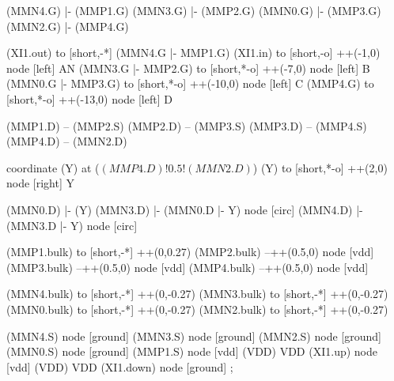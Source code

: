 \begin{circuitikz}[american]
	
	(MMN4.G) |- (MMP1.G)
	(MMN3.G) |- (MMP2.G)
	(MMN0.G) |- (MMP3.G)
	(MMN2.G) |- (MMP4.G)
	
	(XI1.out) to [short,-*] (MMN4.G |- MMP1.G)
	(XI1.in) to [short,-o] ++(-1,0) node [left] {AN}
	(MMN3.G |- MMP2.G) to [short,*-o] ++(-7,0) node [left] {B}
	(MMN0.G |- MMP3.G) to [short,*-o] ++(-10,0) node [left] {C}
	(MMP4.G) to [short,*-o] ++(-13,0) node [left] {D}	
	
	(MMP1.D) -- (MMP2.S)
	(MMP2.D) -- (MMP3.S)	
	(MMP3.D) -- (MMP4.S)
	(MMP4.D) -- (MMN2.D)
	
	coordinate (Y) at ($(MMP4.D)!0.5!(MMN2.D)$)
	(Y) to [short,*-o] ++(2,0) node [right] {Y}
	
	(MMN0.D) |- (Y)
	(MMN3.D) |- (MMN0.D |- Y) node [circ] {}
	(MMN4.D) |- (MMN3.D |- Y) node [circ] {}
	
	(MMP1.bulk) to [short,-*] ++(0,0.27)
	(MMP2.bulk) --++(0.5,0) node [vdd] {}
	(MMP3.bulk) --++(0.5,0) node [vdd] {}
	(MMP4.bulk) --++(0.5,0) node [vdd] {}
	
	(MMN4.bulk) to [short,-*] ++(0,-0.27)
	(MMN3.bulk) to [short,-*] ++(0,-0.27)
	(MMN0.bulk) to [short,-*] ++(0,-0.27)
	(MMN2.bulk) to [short,-*] ++(0,-0.27)


	(MMN4.S) node [ground] {}
	(MMN3.S) node [ground] {}
	(MMN2.S) node [ground] {}
	(MMN0.S) node [ground] {}
	(MMP1.S) node [vdd] (VDD) {VDD}
	(XI1.up) node [vdd] (VDD) {VDD}
	(XI1.down) node [ground] {}
;

\end{circuitikz}

